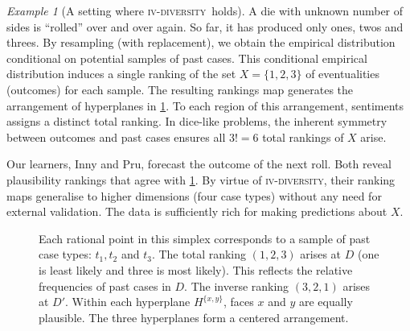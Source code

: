 \documentclass[ecta,nameyear,draft]{econsocart}
\newcommand{\fourdiv}{\textsc{iv}-\textsc{diversity}}
\theoremstyle{plain}
\theoremstyle{remark}
\newtheorem{example}{Example}%
\begin{document}
\begin{example}[A setting where \fourdiv\ holds]\label{eg-tali}
  A die with unknown number of sides is ``rolled'' over and
  over again. So far, it has produced only ones, twos and threes. By resampling 
  (with replacement), we obtain the empirical distribution conditional on
  potential samples of past cases. This conditional empirical distribution
  induces a single ranking of the set $X=\{1, 2, 3\}$ of eventualities
  (outcomes) for each sample. The resulting rankings map generates the
  arrangement of hyperplanes in \cref{fig-tali}.  To each region of this
  arrangement, {sentiments} assigns a distinct total ranking.  
  In dice-like problems, the inherent symmetry between outcomes and past cases
  ensures all $3!=6$ total rankings of $X$ arise.
 
  Our learners, Inny and {Pru}, forecast the outcome of the next roll.  Both
  reveal plausibility rankings that agree with \cref{fig-tali}. By virtue of
  \fourdiv, their ranking maps generalise to higher dimensions (four case
  types) without any need for external validation. The data is sufficiently
  rich for making predictions about $X$.
  \begin{figure}
    \centering  \caption{\label{fig-tali} Each
      rational point in this simplex corresponds to a sample of past case
      types: $t_1, t_2$ and $t_3$.  The total ranking $(1, 2, 3)$ arises at $D$
      (one is least likely and three is most likely). This reflects the
      relative frequencies of past cases in $D$.  The inverse ranking $(3, 2,
      1)$ arises at $D'$. Within each hyperplane $H^{\{x,y\}}$, faces $x$ and
      $y$ are equally plausible.  The three hyperplanes form a centered
    arrangement.}
  \end{figure}
\end{example}
\end{document}
